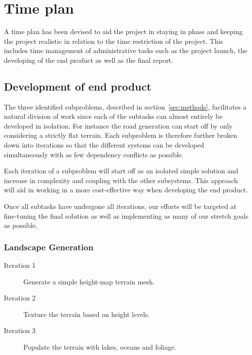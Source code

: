 \section{Time plan}

A time plan has been devised to aid the project in staying in phase and keeping the project realistic in relation to the time restriction of the project.
This includes time management of administrative tasks such as the project launch, the developing of the end product as well as the final report.

\subsection{Development of end product}
The three identified subproblems, described in section~\ref{sec:methods}, facilitates a natural division of work since each of the subtasks can almost entirely be developed in isolation.
For instance the road generation can start off by only considering a strictly flat terrain.
Each subproblem is therefore further broken down into iterations so that the different systems can be developed simultaneously with as few dependency conflicts as possible.

Each iteration of a subproblem will start off as an isolated simple solution and increase in complexity and coupling with the other subsystems.
This approach will aid in working in a more cost-effective way when developing the end product.

Once all subtasks have undergone all iterations, our efforts will be targeted at fine-tuning the final solution as well as implementing as many of our stretch goals as possible.

\subsubsection{Landscape Generation}
\begin{description}
  \item[Iteration 1] Generate a simple height-map terrain mesh.
  \item[Iteration 2] Texture the terrain based on height levels.
  \item[Iteration 3] Populate the terrain with lakes, oceans and foliage.
\end{description}

